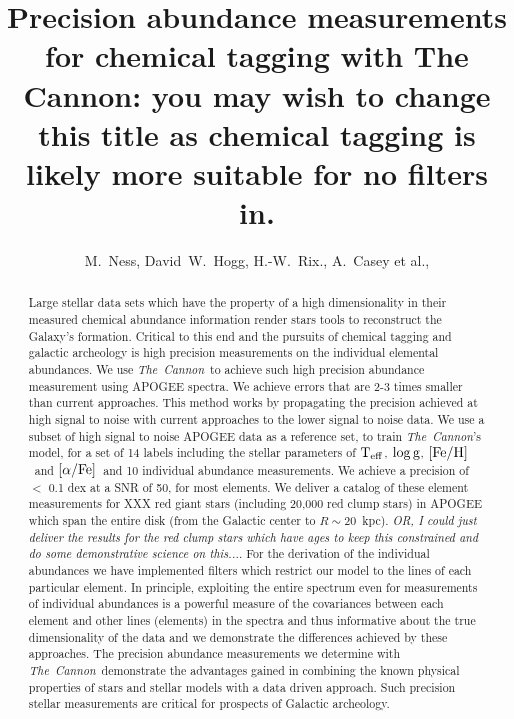 \documentclass[12pt, preprint]{aastex}
\newcommand{\project}[1]{\textsl{#1}}
\newcommand{\tc}{\project{The~Cannon}}
\newcommand{\teff}{\mbox{$\rm T_{eff}$}}
\newcommand{\feh}{\mbox{$\rm [Fe/H]$}}
\newcommand{\alphafe}{\mbox{$\rm [\alpha/Fe]$}}
\newcommand{\logg}{\mbox{$\rm \log g$}}
\begin{document}
\title{Precision abundance measurements for chemical tagging with The Cannon: you may wish to change this title as chemical tagging is likely more suitable for no filters in. }
\author{M.~Ness,
        David~W.~Hogg,
        H.-W.~Rix.,
         A.~Casey et al.,}


\begin{abstract}%
Large stellar data sets which have the property of a high dimensionality in their measured chemical abundance information render stars tools to reconstruct the Galaxy's formation. Critical to this end and the pursuits of chemical tagging and galactic archeology is high precision measurements on the individual elemental abundances. We use \tc\ to achieve such high precision abundance measurement using APOGEE spectra. We achieve errors that are 2-3 times smaller than current approaches.  This method works by propagating the precision achieved at high signal to noise with current approaches to the lower signal to noise data. We use a subset of high signal to noise APOGEE data as a reference set, to train \tc's model, for a set of 14 labels including the stellar parameters of \teff, \logg, \feh\ and \alphafe\ and 10 individual abundance measurements. We achieve a precision of $<$ 0.1 dex at a SNR of 50, for most elements.  We deliver a catalog of these element measurements for XXX red giant stars (including 20,000 red clump stars) in APOGEE which span the entire disk (from the Galactic center to $R\sim 20$~kpc). \textit{OR, I could just deliver the results for the red clump stars which have ages to keep this constrained and do some demonstrative science on this...}. 
For the derivation of the individual abundances we have implemented filters which restrict our model to the lines of each particular element. In principle, exploiting the entire spectrum even for measurements of individual abundances is a powerful measure of the covariances between each element and other lines (elements) in the spectra and thus informative about the true dimensionality of the data and we demonstrate the differences achieved by these approaches. The precision abundance measurements we determine with \tc\ demonstrate the advantages gained in combining the known physical properties of stars and stellar models with a data driven approach. Such precision stellar measurements are critical for prospects of Galactic archeology.


\end{abstract}
\end{document}

